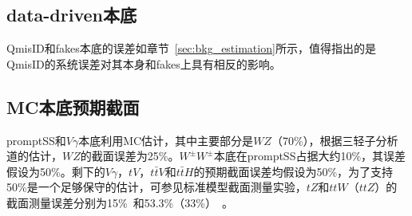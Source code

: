 \subsection{data-driven本底}
QmisID和fakes本底的误差如章节~\ref{sec:bkg_estimation}所示，值得指出的是QmisID的系统误差对其本身和fakes上具有相反的影响。

\subsection{MC本底预期截面}
promptSS和$V\gamma$本底利用MC估计，其中主要部分是$WZ$（70\%），根据三轻子分析道的估计，$WZ$的截面误差为25\%。$W^{\pm}W^{\pm}$本底在promptSS占据大约10\%，其误差
假设为50\%。剩下的$V\gamma$，$tV$，$t\bar{t}V$和$t\bar{t}H$的预期截面误差均假设为50\%，为了支持50\%是一个足够保守的估计，可参见标准模型截面测量实验，$tZ$和$ttW$（$ttZ$）的
截面测量误差分别为15\%~\cite{xsection_WZ}和53.3\%（33\%）~\cite{xsection_ttV}。

